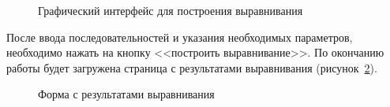 \begin{figure}[h]
	\caption{Графический интерфейс для построения выравнивания}
	\label{ris:webka}
\end{figure}

После ввода последовательностей и указания необходимых параметров, необходимо нажать на кнопку <<построить выравнивание>>. По окончанию работы будет загружена страница с результатами выравнивания (рисунок~\ref{ris:webkares}).

\begin{figure}[h]
	\caption{Форма с результатами выравнивания}
	\label{ris:webkares}
\end{figure}